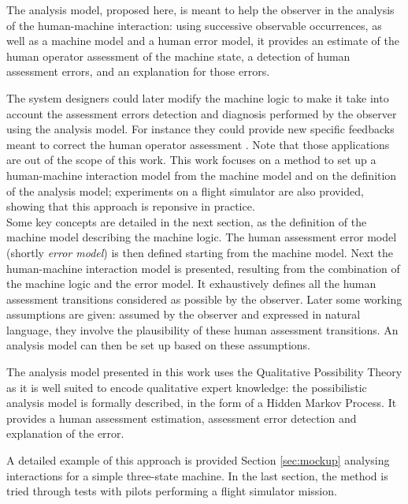 The analysis model, proposed here, is meant to help 
the observer in the analysis of the human-machine interaction: 
using successive observable occurrences, as well as a machine model and a human error model, 
it provides an estimate of the human operator assessment of the machine 
state, a detection of human assessment errors, and an explanation for 
those errors.

The system designers could later modify the machine logic to make it 
take into account the assessment errors detection 
and diagnosis performed by the observer
using the analysis model. 
For instance they could provide 
new specific feedbacks meant to correct the human operator assessment \cite{dehais11ae,dehais11hf}. 
Note that those applications are out of the scope of this work. 
This work focuses on a method to set up a human-machine interaction 
model from the machine model and on the definition of the analysis model;
experiments on a flight simulator are also provided, showing that 
this approach is reponsive in practice. \\


Some key concepts are detailed in the next section, as the definition of the machine model describing the machine logic.
The human assessment error model (shortly {\em error model}) is then defined starting from the machine model.
Next the human-machine interaction model is presented, 
resulting from the combination of the machine logic and
the error model. It exhaustively defines all the human assessment transitions 
considered as possible by the observer. 
Later some working assumptions are given:
assumed by the observer
and expressed in natural language, they involve
the plausibility of these human assessment transitions. 
An analysis model can then be set up based on these assumptions.

The analysis model presented in this work uses the Qualitative Possibility Theory
as it is well suited to encode qualitative expert knowledge:
the possibilistic analysis model is formally described, 
in the form of a Hidden Markov Process. 
It provides a human assessment estimation, 
assessment error detection and explanation of the error.

A detailed example of this approach is provided 
Section \ref{sec:mockup} analysing interactions 
for a simple three-state machine.
In the last section, the method is tried 
through tests with pilots performing a flight 
simulator mission.

